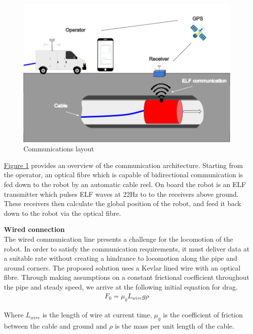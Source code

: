 \documentclass[11pt]{article}		%
\newcommand{\figref}[1]{\hyperref[#1]{Figure \ref*{#1}}}    %
\begin{document}
        \begin{figure}[h]
			\centering
			\includegraphics[scale=1]{comms layout.pdf}
			\caption{Communications layout} %
			\label{commsLayout}
		\end{figure}
        
        \figref{commsLayout} provides an overview of the communication architecture. 
        Starting from the operator, an optical fibre which is capable of bidirectional communication is fed down to the robot by an automatic cable reel. 
        On board the robot is an ELF transmitter which pulses ELF waves at 22Hz to to the receivers above ground. 
        These receivers then calculate the global position of the robot, and feed it back down to the robot via the optical fibre.
       
        \textbf{Wired connection}
        \\
        The wired communication line presents a challenge for the locomotion of the robot. 
        In order to satisfy the communication requirements, it must deliver data at a suitable rate without creating a hindrance to locomotion along the pipe and around corners. 
        The proposed solution uses a Kevlar lined wire with an optical fibre. 
        Through making assumptions on a constant frictional coefficient throughout the pipe and steady speed, we arrive at the following initial equation for drag. 
        \begin{align}
				F_0 = \mu_g L_{wire}   g \rho
		\end{align}
        
        
        Where $L_{wire}$ is the length of wire at current time, $\mu_g$ is the coefficient of friction between the cable and ground and $\rho$ is the mass per unit length of the cable.
        
\end{document}
